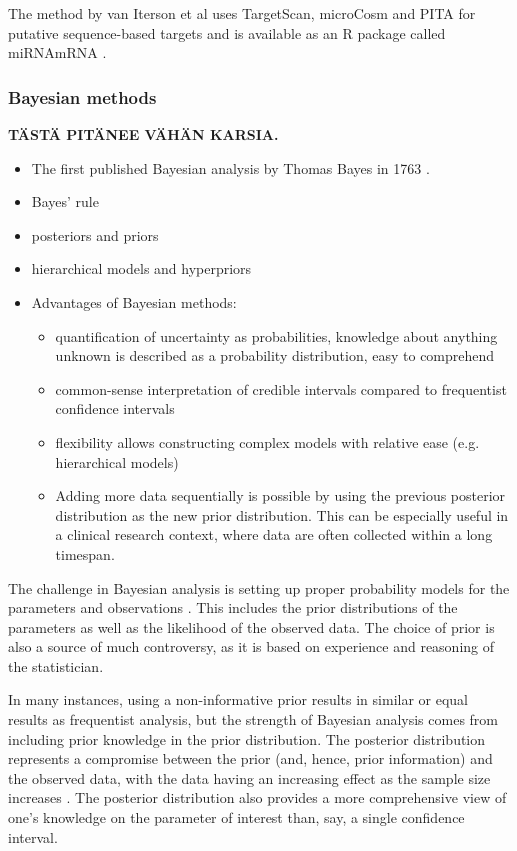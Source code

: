 The method by van Iterson et al uses TargetScan, microCosm and PITA for
putative sequence-based targets and is available as an R package called
miRNAmRNA \citep{vanItersonWeb}.








\subsubsection{Bayesian methods}\label{bayesian-methods}

\textbf{TÄSTÄ PITÄNEE VÄHÄN KARSIA.}

\begin{itemize}
  \item The first published Bayesian analysis by Thomas Bayes in 1763 \citep{Gelman2013}.
  \item Bayes' rule
  \item posteriors and priors
  \item hierarchical models and hyperpriors
  \item Advantages of Bayesian methods:
  \begin{itemize}
    \item
    quantification of uncertainty as probabilities, knowledge about anything
    unknown is described as a probability distribution, easy to comprehend
    \item
    common-sense interpretation of credible intervals compared to frequentist
    confidence intervals
    \item
    flexibility allows constructing complex models with relative ease (e.g.
    hierarchical models)
    \item
    Adding more data sequentially is possible by using the previous posterior
    distribution as the new prior distribution. This can be especially useful in
    a clinical research context, where data are often collected within a long
    timespan.
  \end{itemize}
\end{itemize}
The challenge in Bayesian analysis is setting up proper probability models for
the parameters and observations \citep{Gelman2013}. This includes the prior
distributions of the parameters as well as the likelihood of the observed data.
The choice of prior is also a source of much controversy, as it is based
on experience and reasoning of the statistician.

In many instances, using a non-informative prior results in similar or equal
results as frequentist analysis, but the strength of Bayesian analysis comes
from including prior knowledge in the prior distribution. \citep{Jaynes?} The
posterior distribution represents a compromise between the prior (and, hence,
prior information) and the observed data, with the data having an increasing
effect as the sample size increases \citep{Gelman2013}. The posterior
distribution also provides a more comprehensive view of
one's knowledge on the parameter of interest than, say, a single confidence
interval.

